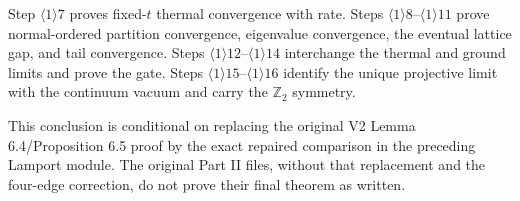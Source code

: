 \documentclass[11pt,a4paper]{article}
\newcommand{\Z}{\mathbb Z}
\begin{document}
\begin{resultbox}
Step $\langle1\rangle7$ proves fixed-$t$ thermal convergence with rate.
Steps $\langle1\rangle8$--$\langle1\rangle11$ prove normal-ordered partition
convergence, eigenvalue convergence, the eventual lattice gap, and tail convergence.
Steps $\langle1\rangle12$--$\langle1\rangle14$ interchange the thermal and ground
limits and prove the gate.  Steps $\langle1\rangle15$--$\langle1\rangle16$
identify the unique projective limit with the continuum vacuum and carry the
$\Z_2$ symmetry.

This conclusion is conditional on replacing the original V2 Lemma 6.4/Proposition
6.5 proof by the exact repaired comparison in the preceding Lamport module.  The
original Part II files, without that replacement and the four-edge correction, do
not prove their final theorem as written.
\end{resultbox}
\end{document}
